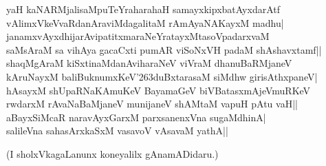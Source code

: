 \begin{shloka} 
yaH kaNARMjalisaMpuTeYraharahaH samayxkipxbatAyxdarAtf\label{208a}\\ 
vAlimxVkeVvaRdanAraviMdagalitaM rAmAyaNAKayxM madhu|\\ 
janamxvAyxdhijarAvipatitxmaraNeYratayxMtasoVpadarxvaM\\ 
saMsAraM sa vihAya gacaCxti pumAR viSoNxVH padaM shAshavxtamf||\\ 
shaqMgAraM kiSxtinaMdanAviharaNeV viVraM dhanuBaRMjaneV\label{208c}\\ 
kAruNayxM baliBuknumxKeV\char'263duBxtarasaM siMdhw girisAthxpaneV|\\ 
hAsayxM shUpaRNaKAmuKeV BayamaGeV biVBatasxmAjeVmuRKeV\\ 
rwdarxM rAvaNaBaMjaneV munijaneV shAMtaM vapuH pAtu vaH||\\ 
aBayxSiMcaR naravAyxGarxM parxsanenxVna sugaMdhinA|\label{208}\\ 
salileVna sahasArxkaSxM vasavoV vAsavaM yathA|| 
\end{shloka}

\begin{center} 
(I sholxVkagaLanunx koneyalilx gAnamADidaru.) 
\end{center} 
